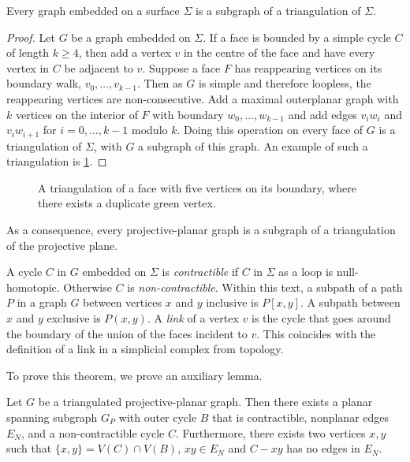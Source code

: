 \begin{theorem}\label{thm:triangulation_subgraph}
    Every graph embedded on a surface $\Sigma$ is a subgraph of a triangulation of $\Sigma$.
\end{theorem}

\begin{proof}
    Let $G$ be a graph embedded on $\Sigma$. If a face is bounded by a simple cycle $C$ of length $k \geq 4$, then add a vertex $v$ in the centre of the face and have every vertex in $C$ be adjacent to $v$. Suppose a face $F$ has reappearing vertices on its boundary walk, $v_0, \ldots, v_{k-1}$. Then as $G$ is simple and therefore loopless, the reappearing vertices are non-consecutive. Add a maximal outerplanar graph with $k$ vertices on the interior of $F$ with boundary $w_0, \ldots, w_{k-1}$ and add edges $v_i w_i$ and $v_i w_{i + 1}$ for $i = 0, \ldots, {k-1}$ modulo $k$. Doing this operation on every face of $G$ is a triangulation of $\Sigma$, with $G$ a subgraph of this graph. An example of such a triangulation is \cref{fig:triangulation}.
\end{proof}
\begin{figure}[h!]
    \centering
    
    \caption[Face triangulation]{A triangulation of a face with five vertices on its boundary, where there exists a duplicate green vertex.}\label{fig:triangulation}
\end{figure}
As a consequence, every projective-planar graph is a subgraph of a triangulation of the projective plane. 

A cycle $C$ in $G$ embedded on $\Sigma$ is \textit{contractible} if $C$ in $\Sigma$ as a loop is null-homotopic. Otherwise $C$ is \textit{ non-contractible}. Within this text, a subpath of a path $P$ in a graph $G$ between vertices $x$ and $y$ inclusive is $P[x, y]$. A subpath between $x$ and $y$ exclusive is $P(x, y)$. 
A \textit{link} of a vertex $v$ is the cycle that goes around the boundary of the union of the faces incident to $v$. This coincides with the definition of a link in a simplicial complex from topology. 

To prove this theorem, we prove an auxiliary lemma. 

\begin{lemma}\label{lem:proj_planar triangulation}
    Let $G$ be a triangulated projective-planar graph. Then there exists a planar spanning subgraph $G_P$ with outer cycle $B$ that is contractible, nonplanar edges $E_N$, and a non-contractible cycle $C$. Furthermore, there exists two vertices $x, y$ such that $\{x, y \} = V(C) \cap V(B)$, $xy \in E_N$ and $C - xy$ has no edges in $E_N$. 
\end{lemma}

